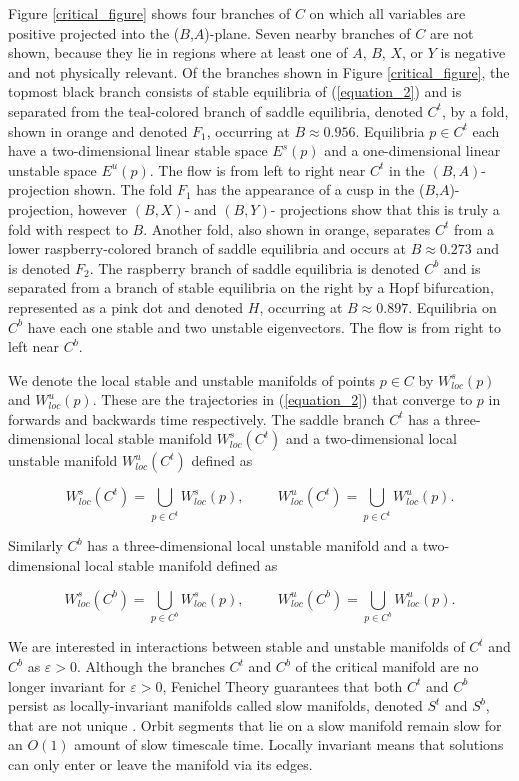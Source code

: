 \documentclass{ws-ijbc}
\begin{document}
Figure \ref{critical_figure} shows four branches of $C$ on which all variables are positive projected into the ($B$,$A$)-plane.  Seven nearby branches of $C$ are not shown, because they lie in regions where at least one of $A$, $B$, $X$, or $Y$ is negative and not physically relevant.  Of the branches shown in Figure \ref{critical_figure}, the topmost black branch consists of stable equilibria of (\ref{equation_2}) and is separated from the teal-colored branch of saddle equilibria, denoted $C^t$, by a fold, shown in orange and denoted $F_1$, occurring at $B \approx 0.956$.  Equilibria $p \in C^t$ each have a two-dimensional linear stable space $E^s(p)$ and a one-dimensional linear unstable space $E^u(p)$.  The flow is from left to right near $C^t$ in the $(B,A)$-projection shown.  The fold $F_1$ has the appearance of a cusp in the ($B$,$A$)-projection, however $(B,X)$- and $(B,Y)$- projections show that this is truly a fold with respect to $B$.  Another fold, also shown in orange, separates $C^t$ from a lower raspberry-colored branch of saddle equilibria and occurs at $B \approx 0.273$ and is denoted $F_2$.  The raspberry branch of saddle equilibria is denoted $C^b$ and is separated from a branch of stable equilibria on the right by a Hopf bifurcation, represented as a pink dot and denoted $H$, occurring at $B \approx 0.897$.  Equilibria on $C^b$ have each one stable and two unstable eigenvectors.  The flow is from right to left near $C^b$.
    
We denote the local stable and unstable manifolds of points $p \in C$ by $W^{s}_{loc}(p)$ and $W^{u}_{loc}(p)$.  These are the trajectories in (\ref{equation_2}) that converge to $p$ in forwards and backwards time respectively.  The saddle branch $C^t$ has a three-dimensional local stable manifold $W^{s}_{loc}(C^t)$ and a two-dimensional local unstable manifold $W^{u}_{loc}(C^t)$ defined as
    
$$W^{s}_{loc}(C^t) = \bigcup_{p \in C^t} W^{s}_{loc}(p), \hspace{1cm} W^{u}_{loc}(C^t) = \bigcup_{p \in C^t} W^{u}_{loc}(p).$$
    
\noindent
Similarly $C^b$ has a three-dimensional local unstable manifold and a two-dimensional local stable manifold defined as
    
$$W^{s}_{loc}(C^b) = \bigcup_{p \in C^b} W^{s}_{loc}(p), \hspace{1cm} W^{u}_{loc}(C^b) = \bigcup_{p \in C^b} W^{u}_{loc}(p).$$
    
We are interested in interactions between stable and unstable manifolds of $C^t$ and $C^b$ as $\varepsilon > 0$.  Although the branches $C^t$ and $C^b$ of the critical manifold are no longer invariant for $\varepsilon > 0$, Fenichel Theory guarantees that both $C^t$ and $C^b$ persist as locally-invariant manifolds called slow manifolds, denoted $S^t$ and $S^b$, that are not unique \cite{Fenichel}. Orbit segments that lie on a slow manifold remain slow for an $O(1)$ amount of slow timescale time.  Locally invariant means that solutions can only enter or leave the manifold via its edges.  
    
\end{document}

